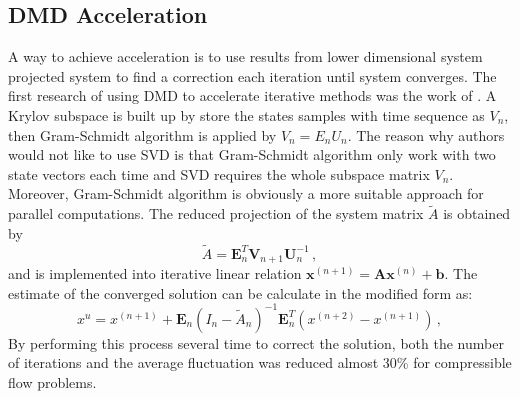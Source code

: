 \subsection{DMD Acceleration}
A way to achieve acceleration is to use results from lower dimensional system projected system to find a correction each iteration until system converges.
The first research of using DMD to accelerate iterative methods was the work of \citet{andersson_novel}.
A Krylov subspace is built up by store the states samples with time sequence as $V_n$, then Gram-Schmidt algorithm is applied by $V_n = E_n U_n$.
The reason why authors would not like to use SVD is that Gram-Schmidt algorithm only work with two state vectors each time and SVD requires the whole subspace matrix $V_n$. 
Moreover, Gram-Schmidt algorithm is obviously a more suitable approach for parallel computations. 
The reduced projection of the system matrix $\tilde{A}$ is obtained by 
\begin{equation}
 \tilde{A} = \mathbf{E}_n^T \mathbf{V}_{n+1} \mathbf{U}_n^{-1}  \, ,
 \label{eq:andersson_reduce}
\end{equation}
and is implemented into iterative linear relation $\mathbf{x}^{(n+1)} = \mathbf{A}\mathbf{x}^{(n)} + \mathbf{b}$.
The estimate of the converged solution can be calculate in the modified form as:
\begin{equation}
 x^{u} = x^{(n+1)} + \mathbf{E}_n(I_n - \tilde{A}_n)^{-1} \mathbf{E}_n^T(x^{(n+2)} - x^{(n+1)}) \, ,
 \label{eq:andersson}
\end{equation}
By performing this process several time to correct the solution, both the number of iterations and the average fluctuation was reduced almost 30\% for compressible flow problems. 

